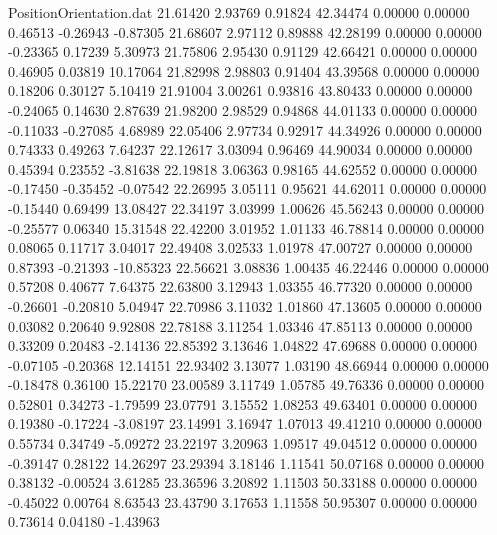 \begin{filecontents}{PositionOrientation.dat}
  21.61420    2.93769    0.91824    42.34474    0.00000    0.00000    0.46513   -0.26943   -0.87305
  21.68607    2.97112    0.89888    42.28199    0.00000    0.00000   -0.23365    0.17239    5.30973
  21.75806    2.95430    0.91129    42.66421    0.00000    0.00000    0.46905    0.03819   10.17064
  21.82998    2.98803    0.91404    43.39568    0.00000    0.00000    0.18206    0.30127    5.10419
  21.91004    3.00261    0.93816    43.80433    0.00000    0.00000   -0.24065    0.14630    2.87639
  21.98200    2.98529    0.94868    44.01133    0.00000    0.00000   -0.11033   -0.27085    4.68989
  22.05406    2.97734    0.92917    44.34926    0.00000    0.00000    0.74333    0.49263    7.64237
  22.12617    3.03094    0.96469    44.90034    0.00000    0.00000    0.45394    0.23552   -3.81638
  22.19818    3.06363    0.98165    44.62552    0.00000    0.00000   -0.17450   -0.35452   -0.07542
  22.26995    3.05111    0.95621    44.62011    0.00000    0.00000   -0.15440    0.69499   13.08427
  22.34197    3.03999    1.00626    45.56243    0.00000    0.00000   -0.25577    0.06340   15.31548
  22.42200    3.01952    1.01133    46.78814    0.00000    0.00000    0.08065    0.11717    3.04017
  22.49408    3.02533    1.01978    47.00727    0.00000    0.00000    0.87393   -0.21393  -10.85323
  22.56621    3.08836    1.00435    46.22446    0.00000    0.00000    0.57208    0.40677    7.64375
  22.63800    3.12943    1.03355    46.77320    0.00000    0.00000   -0.26601   -0.20810    5.04947
  22.70986    3.11032    1.01860    47.13605    0.00000    0.00000    0.03082    0.20640    9.92808
  22.78188    3.11254    1.03346    47.85113    0.00000    0.00000    0.33209    0.20483   -2.14136
  22.85392    3.13646    1.04822    47.69688    0.00000    0.00000   -0.07105   -0.20368   12.14151
  22.93402    3.13077    1.03190    48.66944    0.00000    0.00000   -0.18478    0.36100   15.22170
  23.00589    3.11749    1.05785    49.76336    0.00000    0.00000    0.52801    0.34273   -1.79599
  23.07791    3.15552    1.08253    49.63401    0.00000    0.00000    0.19380   -0.17224   -3.08197
  23.14991    3.16947    1.07013    49.41210    0.00000    0.00000    0.55734    0.34749   -5.09272
  23.22197    3.20963    1.09517    49.04512    0.00000    0.00000   -0.39147    0.28122   14.26297
  23.29394    3.18146    1.11541    50.07168    0.00000    0.00000    0.38132   -0.00524    3.61285
  23.36596    3.20892    1.11503    50.33188    0.00000    0.00000   -0.45022    0.00764    8.63543
  23.43790    3.17653    1.11558    50.95307    0.00000    0.00000    0.73614    0.04180   -1.43963

\end{filecontents}
